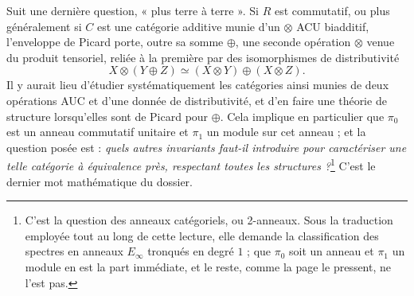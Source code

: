 \documentclass[11pt,a4paper]{article}
\begin{document}
Suit une dernière question, « plus terre à terre ». Si $R$ est commutatif, ou
plus généralement si $C$ est une catégorie additive munie d'un $\otimes$ ACU
biadditif, l'enveloppe de Picard porte, outre sa somme $\oplus$, une seconde
opération $\otimes$ venue du produit tensoriel, reliée à la première par des
isomorphismes de distributivité
\[
X \otimes (Y \oplus Z) \simeq (X \otimes Y) \oplus (X \otimes Z).
\]
Il y aurait lieu d'étudier systématiquement les catégories ainsi munies de
deux opérations AUC et d'une donnée de distributivité, et d'en faire une
théorie de structure lorsqu'elles sont de Picard pour $\oplus$. Cela implique
en particulier que $\pi_{0}$ est un anneau commutatif unitaire et $\pi_{1}$ un
module sur cet anneau ; et la question posée est : \emph{quels autres
invariants faut-il introduire pour caractériser une telle catégorie à
équivalence près, respectant toutes les structures ?}\footnote{C'est la
question des anneaux catégoriels, ou 2-anneaux. Sous la traduction employée
tout au long de cette lecture, elle demande la classification des spectres en
anneaux $E_{\infty}$ tronqués en degré $1$ ; que $\pi_{0}$ soit un anneau et $\pi_{1}$
un module en est la part immédiate, et le reste, comme la page le pressent,
ne l'est pas.} C'est le dernier mot mathématique du
dossier.
\end{document}
